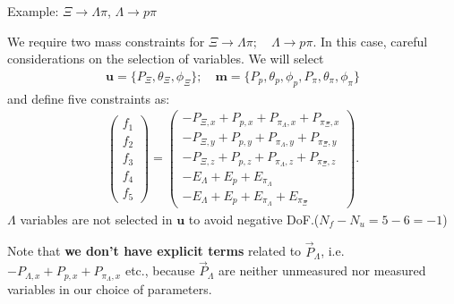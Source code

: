 \documentclass[
	xcolor=dvipsnames,
	aspectratio=169,	
	10pt, 
	]{beamer}
\begin{document}
\begin{frame}{Example: $\Xi\to \Lambda\pi$, $\Lambda\to p\pi$}
	\begin{block}{}
		We require two mass constraints for $\Xi\to \Lambda\pi;\quad \Lambda\to p\pi$. In this case, careful considerations on the selection of variables. We will select
		\begin{align}
			\mathbf{u} = \{P_\Xi,\theta_\Xi,\phi_\Xi\};\quad \mathbf{m}=\{P_p,\theta_p,\phi_p,P_\pi,\theta_\pi,\phi_\pi\}
		\end{align}
		and define five constraints as:
		\begin{align}
			\begin{pmatrix}
				f_1\\f_2\\f_3\\f_4\\f_5
			\end{pmatrix}=
			\begin{pmatrix}
				-P_{\Xi,x}+P_{p,x}+P_{{\pi_\Lambda},x}+P_{{\pi_\Xi},x}\\
				-P_{\Xi,y}+P_{p,y}+P_{{\pi_\Lambda},y}+P_{{\pi_\Xi},y}\\
				-P_{\Xi,z}+P_{p,z}+P_{{\pi_\Lambda},z}+P_{{\pi_\Xi},z}\\
				-E_\Lambda +E_p+E_{\pi_\Lambda}\\
				-E_\Lambda +E_p+E_{\pi_\Lambda}+E_{\pi_\Xi}
			\end{pmatrix}.
		\end{align}
		$\Lambda$ variables are not selected in $\mathbf u$ to avoid negative DoF.($N_{f} - N_{u} = 5 - 6 = -1$)
			
		Note that \textbf{we don't have explicit terms} related to $\vec P_\Lambda$, i.e.  $-P_{\Lambda,x}+P_{p,x}+P_{{\pi_\Lambda},x}$ etc., because $\vec P_\Lambda$ are neither unmeasured nor measured variables in our choice of parameters.  
	\end{block}
\end{frame}
\end{document}

